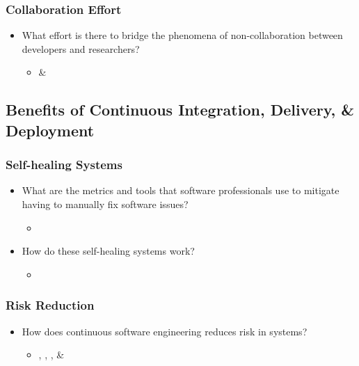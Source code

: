 \documentclass[11pt,a4paper]{article}
\begin{document}
		\subsubsection{Collaboration Effort}
		\begin{itemize}[noitemsep]
			\item What effort is there to bridge the phenomena of non-collaboration between developers and researchers?
			\begin{itemize}
				\item \cite{bosch_2014} \& \cite{stahl_2017}
			\end{itemize}
		\end{itemize}

	\subsection{Benefits of Continuous Integration, Delivery, \& Deployment}
		\subsubsection{Self-healing Systems}
		\begin{itemize}[noitemsep]
			\item What are the metrics and tools that software professionals use to mitigate having to manually fix software issues?
			\begin{itemize}
				\item \cite{bosch_2014}
			\end{itemize}
			\item How do these self-healing systems work?
			\begin{itemize}
				\item \cite{bosch_2014}
			\end{itemize}
		\end{itemize}
		\subsubsection{Risk Reduction}
		\begin{itemize}[noitemsep]
			\item How does continuous software engineering reduces risk in systems?
			\begin{itemize}
				\item \cite{atkinson_edwards_2018}, \cite{bosch_2014}, \cite{stackify_2018}, \& \cite{stahl_2017} \cite{stackify_2018}
			\end{itemize}
		\end{itemize}
\end{document}
